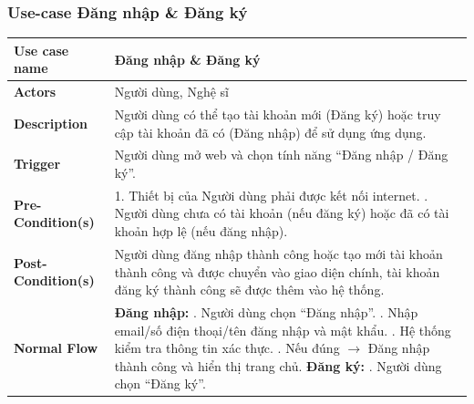 \documentclass[a4paper]{article}
\begin{document}
\subsubsection{Use-case Đăng nhập \& Đăng ký}
\begin{table}[H]
	\centering
	\renewcommand{\arraystretch}{1.3} %
	\begin{tabularx}{\textwidth}{|l|X|}
		\hline
		\textbf{Use case name} & Đăng nhập \& Đăng ký                                                                                                                                          \\ \hline
		\textbf{Actors}        & Người dùng, Nghệ sĩ                                                                                                                                           \\ \hline
		\textbf{Description}   & Người dùng có thể tạo tài khoản mới (Đăng ký) hoặc truy cập tài khoản đã có (Đăng nhập) để sử dụng ứng dụng.                                                  \\ \hline
		\textbf{Trigger}       & Người dùng mở web và chọn tính năng “Đăng nhập / Đăng ký”.                                                                                                    \\ \hline
		\textbf{Pre-Condition(s)}&
		1. Thiết bị của Người dùng phải được kết nối internet. \newline
		2. Người dùng chưa có tài khoản (nếu đăng ký) hoặc đã có tài khoản hợp lệ (nếu đăng nhập).                                                                                             \\ \hline
		\textbf{Post-Condition(s)}
		                       & Người dùng đăng nhập thành công hoặc tạo mới tài khoản thành công và được chuyển vào giao diện chính, tài khoản đăng ký thành công sẽ được thêm vào hệ thống. \\ \hline
		\textbf{Normal Flow}
		                       & \textbf{Đăng nhập:} \newline
		1. Người dùng chọn “Đăng nhập”. \newline
		2. Nhập email/số điện thoại/tên đăng nhập và mật khẩu. \newline
		3. Hệ thống kiểm tra thông tin xác thực. \newline
		4. Nếu đúng $\rightarrow$ Đăng nhập thành công và hiển thị trang chủ. \newline
		\textbf{Đăng ký:} \newline
		1. Người dùng chọn “Đăng ký”. \newline

\end{tabularx}
\end{table}
\end{document}
